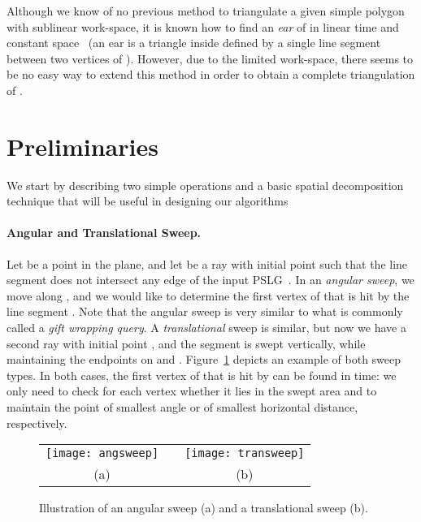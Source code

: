 \documentclass[11pt,a4paper]{article}
\newcommand{\pslg}{PSLG}
\begin{document}
Although we know of no previous method to triangulate a given
simple polygon  with sublinear work-space, it is known how
to find an \emph{ear} of  in linear time and constant
space~\cite{ElGindyEvTo93} (an ear is a triangle inside 
defined by a single line segment between two vertices of ).
However, due to the limited work-space, there seems to be no easy way
to extend this method in order to obtain a complete triangulation of .


\section{Preliminaries}
\label{sec:primitive}

We start by describing two simple operations and a basic spatial
decomposition technique that will be useful in designing our algorithms

\paragraph{Angular and Translational Sweep.} Let  be a point in the
plane, and let  be a ray with initial point  such that the line
segment  does not intersect any edge of the input \pslg\ .
In  an  \emph{angular sweep}, we move  along , and we would like
to determine the first vertex of  that is hit by the line segment
.
Note that the angular sweep is very similar to what is commonly called
a \emph{gift wrapping query}.
A \emph{translational} sweep is similar, but now we have a second ray
 with initial point , and the segment  is
swept vertically,  while maintaining the endpoints on  and . Figure~\ref{fig:sweeps} depicts
an example of both sweep types.
In both cases, the first vertex of  that is hit by  can be found in
 time: we only need to check for each vertex whether it lies
in the swept area and to maintain the point of smallest angle or of smallest
horizontal distance, respectively.

\begin{figure}[htbp]
\begin{center}
\begin{tabular}{cp{8mm}c}
\texttt{[image: angsweep]} &&
\texttt{[image: transweep]} \\
(a) & &(b)
\end{tabular}
\caption{Illustration of an angular sweep (a) and a translational sweep (b).}
\label{fig:sweeps}
\end{center}
\end{figure}
\end{document}
